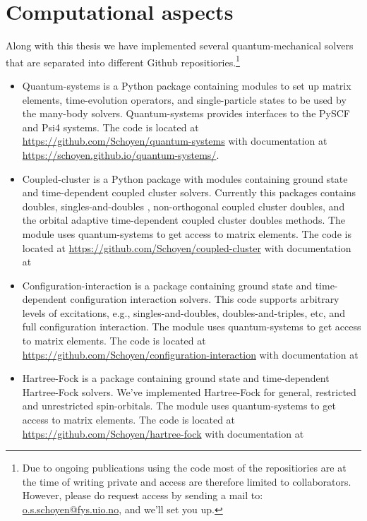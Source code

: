 \chapter{Computational aspects}
    Along with this thesis we have implemented several quantum-mechanical
    solvers that are separated into different Github repositiories.\footnote{%
        Due to ongoing publications using the code most of the repositiories are
        at the time of writing private and access are therefore limited to
        collaborators.
        However, please do request access by sending a mail to:
        \href{mailto:o.s.schoyen@fys.uio.no}{o.s.schoyen@fys.uio.no}, and we'll
        set you up.
    }
    \begin{itemize}
        \item Quantum-systems is a Python package containing modules to set up
            matrix elements, time-evolution operators, and single-particle
            states to be used by the many-body solvers.
            Quantum-systems provides interfaces to the PySCF \cite{pyscf} and
            Psi4 \cite{psi4} systems.
            The code is located at
            \url{https://github.com/Schoyen/quantum-systems} with documentation
            at
            \url{https://schoyen.github.io/quantum-systems/}.
        \item Coupled-cluster is a Python package with modules containing ground
            state and time-dependent coupled cluster solvers.
            Currently this packages contains doubles, singles-and-doubles ,
            non-orthogonal coupled cluster doubles, and the orbital adaptive
            time-dependent coupled cluster doubles methods.
            The module uses quantum-systems to get access to matrix elements.
            The code is located at
            \url{https://github.com/Schoyen/coupled-cluster} with documentation
            at
        \item Configuration-interaction is a package containing ground state and
            time-dependent configuration interaction solvers.
            This code supports arbitrary levels of excitations, e.g.,
            singles-and-doubles, doubles-and-triples, etc, and full
            configuration interaction.
            The module uses quantum-systems to get access to matrix elements.
            The code is located at
            \url{https://github.com/Schoyen/configuration-interaction} with
            documentation at
        \item Hartree-Fock is a package containing ground state and
            time-dependent Hartree-Fock solvers.
            We've implemented Hartree-Fock for general, restricted and
            unrestricted spin-orbitals.
            The module uses quantum-systems to get access to matrix elements.
            The code is located at
            \url{https://github.com/Schoyen/hartree-fock} with
            documentation at
    \end{itemize}
